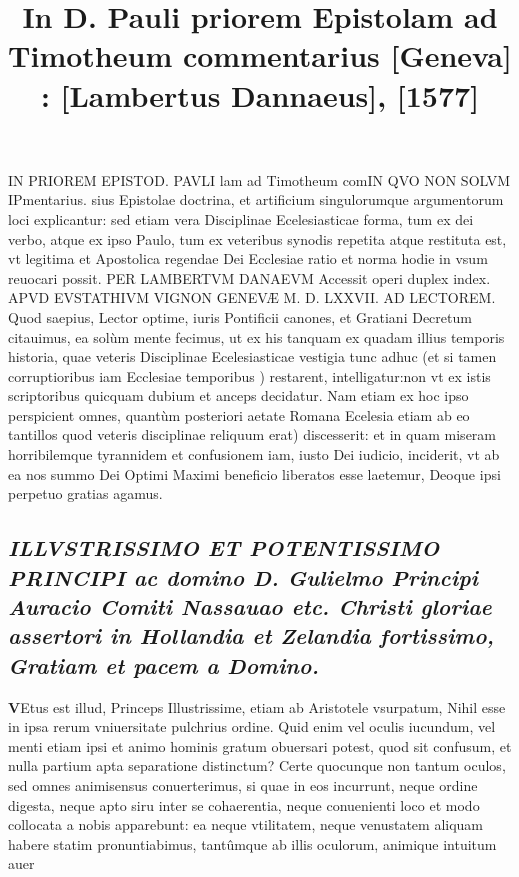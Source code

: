\documentclass{article}
\begin{document}
\date{}
        \title{In D. Pauli priorem Epistolam ad Timotheum commentarius [Geneva] : [Lambertus Dannaeus], [1577]}
\maketitle
\tableofcontents
\clearpage
\begin{pages} 
\beginnumbering
        IN PRIOREM EPISTOD.  PAVLI lam ad Timotheum comIN QVO NON SOLVM IPmentarius. sius Epistolae doctrina, et artificium singulorumque argumentorum loci explicantur: sed etiam vera Disciplinae Ecelesiasticae forma, tum ex dei verbo, atque ex ipso Paulo, tum ex veteribus synodis repetita atque restituta est, vt legitima et Apostolica regendae Dei Ecclesiae ratio et norma hodie in vsum reuocari possit. PER LAMBERTVM DANAEVM Accessit operi duplex index. APVD EVSTATHIVM VIGNON GENEVÆ M. D. LXXVII. \pstart AD LECTOREM. Quod saepius, Lector optime, iuris Pontificii canones, et Gratiani Decretum citauimus, ea solùm mente fecimus, ut ex his tanquam ex quadam illius temporis historia, quae veteris Disciplinae Ecelesiasticae vestigia tunc adhuc (et si tamen corruptioribus iam Ecclesiae temporibus ) restarent, intelligatur:non vt ex istis scriptoribus quicquam dubium et anceps decidatur. Nam etiam ex hoc ipso perspicient omnes, quantùm posteriori aetate Romana Ecelesia etiam ab eo tantillos quod veteris disciplinae reliquum erat) discesserit: et in quam miseram horribilemque tyrannidem et confusionem iam, iusto Dei iudicio, inciderit, vt ab ea nos summo Dei Optimi Maximi beneficio liberatos esse laetemur, Deoque ipsi perpetuo gratias agamus.  \pend
{}
{}
\subsection*{\textit{ILLVSTRISSIMO ET POTENTISSIMO PRINCIPI ac domino D. Gulielmo Principi Auracio Comiti Nassauao etc.  Christi gloriae assertori in Hollandia et Zelandia fortissimo, Gratiam et pacem a Domino. }}\pstart \huge\textbf{V}\normalsize Etus est illud, Princeps Illustrissime, etiam ab Aristotele vsurpatum, Nihil esse in ipsa rerum vniuersitate pulchrius ordine. Quid enim vel oculis iucundum, vel menti etiam ipsi et animo hominis gratum obuersari potest, quod sit confusum, et nulla partium apta separatione distinctum? Certe quocunque non tantum oculos, sed omnes animisensus conuerterimus, si quae in eos incurrunt, neque ordine digesta, neque apto siru inter se cohaerentia, neque conuenienti loco et modo collocata a nobis apparebunt: ea neque vtilitatem, neque venustatem aliquam habere statim pronuntiabimus, tantûmque ab illis oculorum, animique intuitum auer\pend

\end{pages}
\end{document}
